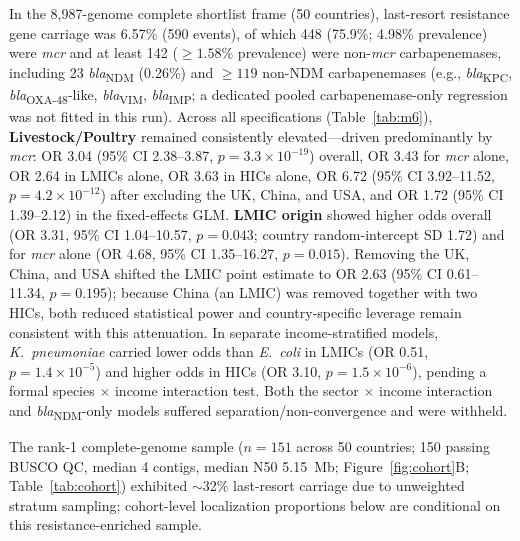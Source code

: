 \documentclass[11pt,a4paper]{article}
\begin{document}
In the 8,987-genome complete shortlist frame (50 countries), last-resort resistance gene carriage was 6.57\% (590 events), of which 448 (75.9\%; 4.98\% prevalence) were \textit{mcr} and at least 142 ($\ge 1.58\%$ prevalence) were non-\textit{mcr} carbapenemases, including 23 \textit{bla}\textsubscript{NDM} (0.26\%) and $\ge 119$ non-NDM carbapenemases (e.g., \textit{bla}\textsubscript{KPC}, \textit{bla}\textsubscript{OXA-48}-like, \textit{bla}\textsubscript{VIM}, \textit{bla}\textsubscript{IMP}; a dedicated pooled carbapenemase-only regression was not fitted in this run). Across all specifications (Table~\ref{tab:m6}), \textbf{Livestock/Poultry} remained consistently elevated---driven predominantly by \textit{mcr}: OR 3.04 (95\% CI 2.38--3.87, $p = 3.3 \times 10^{-19}$) overall, OR 3.43 for \textit{mcr} alone, OR 2.64 in LMICs alone, OR 3.63 in HICs alone, OR 6.72 (95\% CI 3.92--11.52, $p = 4.2 \times 10^{-12}$) after excluding the UK, China, and USA, and OR 1.72 (95\% CI 1.39--2.12) in the fixed-effects GLM. \textbf{LMIC origin} showed higher odds overall (OR 3.31, 95\% CI 1.04--10.57, $p = 0.043$; country random-intercept SD 1.72) and for \textit{mcr} alone (OR 4.68, 95\% CI 1.35--16.27, $p = 0.015$). Removing the UK, China, and USA shifted the LMIC point estimate to OR 2.63 (95\% CI 0.61--11.34, $p = 0.195$); because China (an LMIC) was removed together with two HICs, both reduced statistical power and country-specific leverage remain consistent with this attenuation. In separate income-stratified models, \textit{K.~pneumoniae} carried lower odds than \textit{E.~coli} in LMICs (OR 0.51, $p = 1.4 \times 10^{-5}$) and higher odds in HICs (OR 3.10, $p = 1.5 \times 10^{-6}$), pending a formal species $\times$ income interaction test. Both the sector $\times$ income interaction and \textit{bla}\textsubscript{NDM}-only models suffered separation/non-convergence and were withheld.

The rank-1 complete-genome sample ($n = 151$ across 50 countries; 150 passing BUSCO QC, median 4 contigs, median N50 5.15~Mb; Figure~\ref{fig:cohort}B; Table~\ref{tab:cohort}) exhibited $\sim$32\% last-resort carriage due to unweighted stratum sampling; cohort-level localization proportions below are conditional on this resistance-enriched sample.
\end{document}
